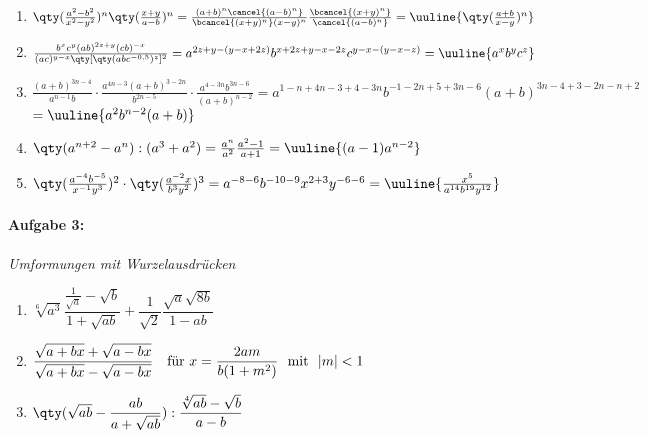 \begin{enumerate}[label=(\alph*)]
    \item $\qty(\frac{a^2-b^2}{x^2-y^2})^n\qty(\frac{x+y}{a-b})^n = \frac{(a+b)^n \cancel{(a-b)^n}}{\bcancel{(x+y)^n}(x-y)^n} \frac{\bcancel{(x+y)^n}}{\cancel{(a-b)^n}} = \uuline{\qty(\frac{a+b}{x-y})^n}$
    \item $\frac{b^xc^y(ab)^{2z+y}(cb)^{-x}}{(ac)^{y-x}\qty[\qty(abc^{-0,5})^z]^2} = a^{2z + y -(y-x+2z)} b^{x+2z+y-x-2z} c^{y-x-(y-x-z)} = \uuline{a^x b^y c^z}$
    \item $\frac{(a+b)^{3n-4}}{a^{n-1}b}\cdot\frac{a^{4n-3}(a+b)^{3-2n}}{b^{2n-5}}\cdot\frac{a^{4-3n}b^{3n-6}}{(a+b)^{n-2}} = a^{1-n+4n-3+4-3n} b^{-1-2n+5+3n-6} (a+b)^{3n-4+3-2n-n+2} $ \\
    $= \uuline{a^2 b^{n-2}(a+b)}$
    \item $\qty(a^{n+2}-a^n):(a^3+a^2) = \frac{a^n}{a^2}\frac{a^2-1}{a+1} = \uuline{(a-1) a^{n-2}}$
    \item $\qty(\frac{a^{-4}b^{-5}}{x^{-1}y^3})^2\cdot\qty(\frac{a^{-2}x}{b^3y^2})^3 = a^{-8-6} b^{-10-9} x^{2+3} y^{-6-6} = \uuline{\frac{x^5}{a^{14} b^{19} y^{12}}}$
\end{enumerate}
%
\paragraph{Aufgabe 3: } \emph{Umformungen mit Wurzelausdrücken}\\[0.2cm]

\begin{mymathbox}[ams align, title={Wurzelgesetze}, colframe={FSUblau}]
\end{mymathbox}


\begin{enumerate}[label=(\alph*)]
    \item $\sqrt[6]{a^3}\dfrac{\frac{1}{\sqrt{a}}-\sqrt{b}}{1+\sqrt{ab}}+\dfrac{1}{\sqrt{2}}\dfrac{\sqrt{a}\sqrt{8b}}{1-ab}$
    \item $\dfrac{\sqrt{a+bx}+\sqrt{a-bx}}{\sqrt{a+bx}-\sqrt{a-bx}} \quad \textnormal{für}\,\, x=\dfrac{2am}{b(1+m^2)}\,\,\textnormal{ mit }\,\, |m|<1$
    \item $\qty(\sqrt{ab}-\dfrac{ab}{a+\sqrt{ab}}):\dfrac{\sqrt[4]{ab}-\sqrt{b}}{a-b}$
\end{enumerate}

